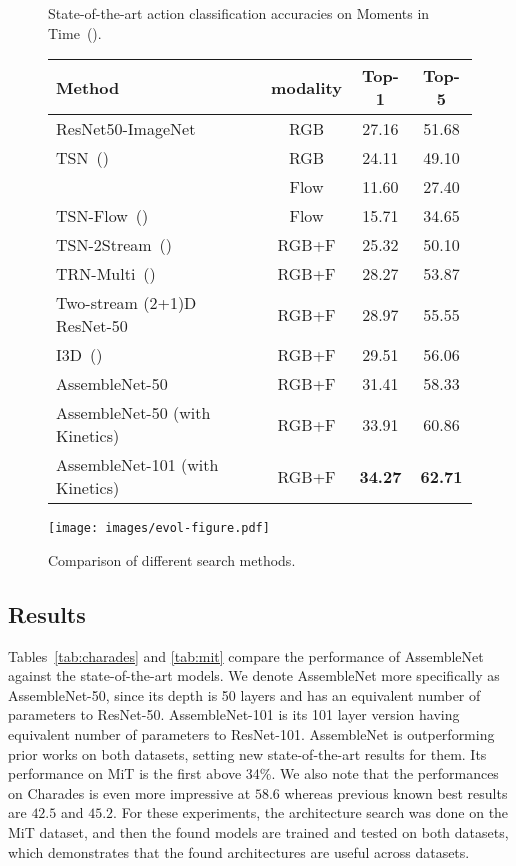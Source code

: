 \documentclass{article} \usepackage{iclr2020_conference,times}
\begin{document}
\begin{figure}
\begin{minipage}{0.55\textwidth}
    \small
    \captionsetup{type=table}
    \setlength\tabcolsep{3pt}
    \caption{State-of-the-art action classification accuracies on Moments in Time~(\citealp{monfort2018moments}).}
    \label{tab:mit}
    \begin{tabular}{lccc}
    \toprule
       Method & modality & Top-1 & Top-5 \\
    \midrule
    ResNet50-ImageNet & RGB & 27.16 & 51.68 \\
    TSN~(\citealp{wang2016temporal})  & RGB & 24.11 & 49.10 \\
    \cite{ioffee2015batch} & Flow & 11.60 & 27.40 \\
TSN-Flow~(\citealp{wang2016temporal}) & Flow & 15.71 & 34.65 \\
    TSN-2Stream~(\citealp{wang2016temporal}) & RGB+F & 25.32 & 50.10 \\
    TRN-Multi~(\citealp{zhou2018temporal}) & RGB+F & 28.27 & 53.87 \\
    Two-stream (2+1)D ResNet-50 & RGB+F & 28.97 & 55.55 \\
    I3D~(\citealp{carreira2017quo}) & RGB+F & 29.51 & 56.06 \\
    \hline
AssembleNet-50 & RGB+F & 31.41 & 58.33 \\
    AssembleNet-50 (with Kinetics) & RGB+F & 33.91 & 60.86 \\
AssembleNet-101 (with Kinetics) & RGB+F & \textbf{34.27} & \textbf{62.71} \\
\bottomrule
    \end{tabular}
\end{minipage}\hfill
\begin{minipage}{0.4\textwidth}
      \centering
       \texttt{[image: images/evol-figure.pdf]}\caption{Comparison of different search methods. }
\label{fig:evolution-graph}
\end{minipage}
\end{figure}

\vspace{-5pt}
\subsection{Results}
\vspace{-5pt}

Tables~\ref{tab:charades} and \ref{tab:mit} compare the performance of AssembleNet against the state-of-the-art models. We denote AssembleNet more specifically as AssembleNet-50, since its depth is 50 layers and has an equivalent number of parameters to ResNet-50. AssembleNet-101 is its 101 layer version having equivalent number of parameters to ResNet-101. 
AssembleNet is outperforming prior works on both datasets, setting new state-of-the-art results for them. Its performance on MiT is the first above 34\%. We also note that the performances on Charades is even more impressive at $58.6$ whereas previous known best results are $42.5$ and $45.2$. For these experiments, the architecture search was done on the MiT dataset, and then the found models are trained and tested on both datasets, which demonstrates that the found architectures are useful across datasets.
\end{document}
